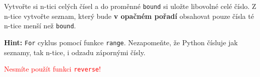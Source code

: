 \question[50]
Vytvořte si n-tici celých čísel a do proměnné \texttt{bound} si uložte libovolné
celé číslo. Z n-tice vytvořte seznam, který bude \textbf{v opačném pořadí}
obsahovat pouze čísla té n-tice menší než \texttt{bound}.

\textbf{Hint:} \texttt{For} cyklus pomocí funkce \texttt{range}. Nezapomeňte, že
Python čísluje jak seznamy, tak n-tice, i odzadu zápornými čísly.

\textcolor{red}{Nesmíte použít funkci \texttt{reverse}!}